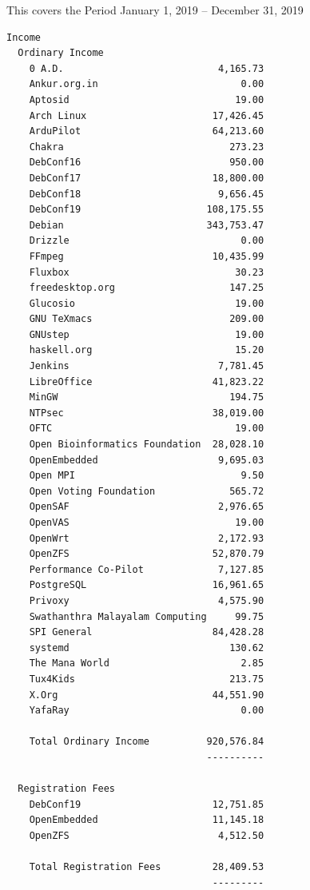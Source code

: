 \documentclass[a4paper]{report}
\begin{document}
This covers the Period January 1, 2019 -- December 31, 2019

\begin{verbatim}
Income
  Ordinary Income
    0 A.D.                           4,165.73
    Ankur.org.in                         0.00
    Aptosid                             19.00
    Arch Linux                      17,426.45
    ArduPilot                       64,213.60
    Chakra                             273.23
    DebConf16                          950.00
    DebConf17                       18,800.00
    DebConf18                        9,656.45
    DebConf19                      108,175.55
    Debian                         343,753.47
    Drizzle                              0.00
    FFmpeg                          10,435.99
    Fluxbox                             30.23
    freedesktop.org                    147.25
    Glucosio                            19.00
    GNU TeXmacs                        209.00
    GNUstep                             19.00
    haskell.org                         15.20
    Jenkins                          7,781.45
    LibreOffice                     41,823.22
    MinGW                              194.75
    NTPsec                          38,019.00
    OFTC                                19.00
    Open Bioinformatics Foundation  28,028.10
    OpenEmbedded                     9,695.03
    Open MPI                             9.50
    Open Voting Foundation             565.72
    OpenSAF                          2,976.65
    OpenVAS                             19.00
    OpenWrt                          2,172.93
    OpenZFS                         52,870.79
    Performance Co-Pilot             7,127.85
    PostgreSQL                      16,961.65
    Privoxy                          4,575.90
    Swathanthra Malayalam Computing     99.75
    SPI General                     84,428.28
    systemd                            130.62
    The Mana World                       2.85
    Tux4Kids                           213.75
    X.Org                           44,551.90
    YafaRay                              0.00

    Total Ordinary Income          920,576.84
                                   ----------

  Registration Fees
    DebConf19                       12,751.85
    OpenEmbedded                    11,145.18
    OpenZFS                          4,512.50

    Total Registration Fees         28,409.53
                                    ---------


\end{verbatim}
\end{document}
